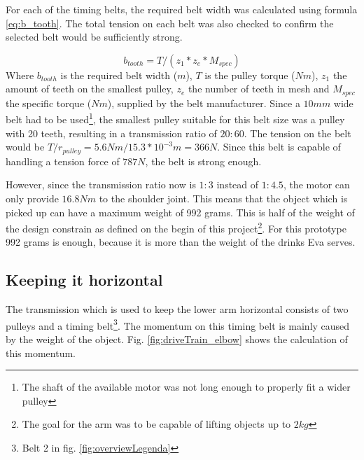 \documentclass[technical_document.tex]{subfiles}
\begin{document}
For each of the timing belts, the required belt width was calculated using formula \ref{eq:b_tooth}. The total tension on each belt was also checked to confirm the selected belt would be sufficiently strong.

\begin{equation}
\label{eq:b_tooth}
b_{tooth} = T/(z_{1}*z_{e}*M_{spec})
\end{equation}
Where $b_{tooth}$ is the required belt width ($m$), $T$ is the pulley torque ($Nm$), $z_{1}$ the amount of teeth on the smallest pulley, $z_{e}$ the number of teeth in mesh and $M_{spec}$ the specific torque ($Nm$), supplied by the belt manufacturer. Since a $10mm$ wide belt had to be used\footnote{The shaft of the available motor was not long enough to properly fit a wider pulley}, the smallest pulley suitable for this belt size was a pulley with 20 teeth, resulting in a transmission ratio of $20:60$. The tension on the belt would be $T / r_{pulley} = 5.6Nm / 15.3*10^{-3}m = 366N$. Since this belt is capable of handling a tension force of $787N$, the belt is strong enough.

However, since the transmission ratio now is $1:3$ instead of $1:4.5$, the motor can only provide $16.8Nm$ to the shoulder joint. This means that the object which is picked up can have a maximum weight of 992 grams. This is half of the weight of the design constrain as defined on the begin of this project\footnote{The goal for the arm was to be capable of lifting objects up to $2kg$}. For this prototype 992 grams is enough, because it is more than the weight of the drinks Eva serves.

\subsection{Keeping it horizontal}

The transmission which is used to keep the lower arm horizontal consists of two pulleys and a timing belt\footnote{Belt 2 in fig. \ref{fig:overviewLegenda}}. The momentum on this timing belt is mainly caused by the weight of the object. Fig. \ref{fig:driveTrain_elbow} shows the calculation of this momentum.
\end{document}
